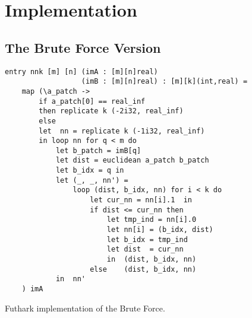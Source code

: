 \section{Implementation}
\label{sec:brute}
\subsection{The Brute Force Version}





\begin{listing}[H]
\begin{verbatim}
entry nnk [m] [n] (imA : [m][n]real) 
                  (imB : [m][n]real) : [m][k](int,real) =
    map (\a_patch ->
        if a_patch[0] == real_inf
        then replicate k (-2i32, real_inf)
        else
        let  nn = replicate k (-1i32, real_inf)
        in loop nn for q < m do
            let b_patch = imB[q]
            let dist = euclidean a_patch b_patch
            let b_idx = q in
            let (_, _, nn') =
                loop (dist, b_idx, nn) for i < k do
                    let cur_nn = nn[i].1  in
                    if dist <= cur_nn then 
                        let tmp_ind = nn[i].0
                        let nn[i] = (b_idx, dist)
                        let b_idx = tmp_ind
                        let dist  = cur_nn
                        in  (dist, b_idx, nn)
                    else    (dist, b_idx, nn)
            in  nn'
    ) imA 
\end{verbatim}
\caption{Futhark implementation of the Brute Force.}
\label{lst:brute}
\end{listing}


